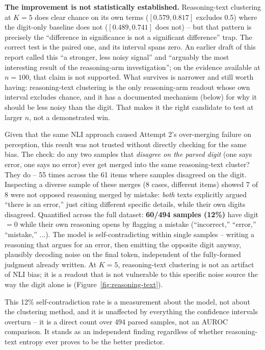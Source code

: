 \documentclass[11pt]{article}
\begin{document}
\textbf{The improvement is not statistically established.} Reasoning-text
clustering at $K=5$ does clear chance on its own terms ($[0.579, 0.817]$ excludes
0.5) where the digit-only baseline does not ($[0.489, 0.741]$ does not) -- but
that pattern is precisely the ``difference in significance is not a significant
difference'' trap. The correct test is the paired one, and its interval spans
zero. An earlier draft of this report called this ``a stronger, less noisy
signal'' and ``arguably the most interesting result of the reasoning-arm
investigation''; on the evidence available at $n=100$, that claim is not
supported. What survives is narrower and still worth having: reasoning-text
clustering is the only reasoning-arm readout whose own interval excludes chance,
and it has a documented mechanism (below) for why it should be less noisy than
the digit. That makes it the right candidate to test at larger $n$, not a
demonstrated win.

Given that the same NLI approach caused Attempt 2's over-merging failure on
perception, this result was not trusted without directly checking for the same
bias. The check: do any two samples that \emph{disagree on the parsed digit}
(one says error, one says no error) ever get merged into the same
reasoning-text cluster? They do -- 55 times across the 61 items where samples
disagreed on the digit. Inspecting a diverse sample of these merges (8 cases,
different items) showed 7 of 8 were not opposed reasoning merged by mistake:
\emph{both} texts explicitly argued ``there is an error,'' just citing
different specific details, while their own digits disagreed. Quantified
across the full dataset: \textbf{60/494 samples (12\%)} have digit$=0$ while
their own reasoning opens by flagging a mistake (``incorrect,'' ``error,''
``mistake,'' ...). The model is self-contradicting within single samples --
writing a reasoning that argues for an error, then emitting the opposite digit
anyway, plausibly decoding noise on the final token, independent of the
fully-formed judgment already written. At $K=5$, reasoning-text clustering is
not an artifact of NLI bias; it is a readout that is not vulnerable to this
specific noise source the way the digit alone is (Figure~\ref{fig:reasoning-text}).

This 12\% self-contradiction rate is a measurement about the model, not about
the clustering method, and it is unaffected by everything the confidence
intervals overturn -- it is a direct count over 494 parsed samples, not an
AUROC comparison. It stands as an independent finding regardless of whether
reasoning-text entropy ever proves to be the better predictor.
\end{document}

